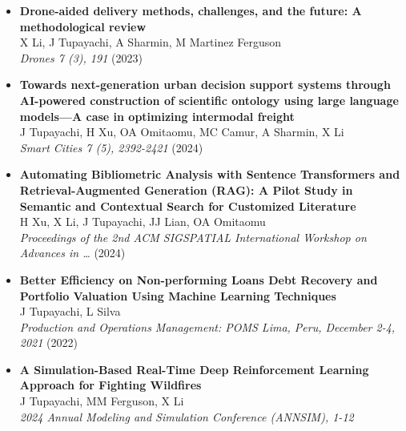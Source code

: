 \documentclass[10pt, letterpaper]{article}
\begin{document}
    \begin{itemize}[left=0pt] %
        \item \textbf{Drone-aided delivery methods, challenges, and the future: A methodological review} \\
        X Li, J Tupayachi, A Sharmin, M Martinez Ferguson \\
        \textit{Drones 7 (3), 191} (2023)\\
    
        \item \textbf{Towards next-generation urban decision support systems through AI-powered construction of scientific ontology using large language models—A case in optimizing intermodal freight} \\
        J Tupayachi, H Xu, OA Omitaomu, MC Camur, A Sharmin, X Li \\
        \textit{Smart Cities 7 (5), 2392-2421} (2024) \\
    
        \item \textbf{Automating Bibliometric Analysis with Sentence Transformers and Retrieval-Augmented Generation (RAG): A Pilot Study in Semantic and Contextual Search for Customized Literature} \\
        H Xu, X Li, J Tupayachi, JJ Lian, OA Omitaomu \\
        \textit{Proceedings of the 2nd ACM SIGSPATIAL International Workshop on Advances in …} (2024) \\
    
        \item \textbf{Better Efficiency on Non-performing Loans Debt Recovery and Portfolio Valuation Using Machine Learning Techniques} \\
        J Tupayachi, L Silva \\
        \textit{Production and Operations Management: POMS Lima, Peru, December 2-4, 2021} (2022) \\
    
    
        \item \textbf{A Simulation-Based Real-Time Deep Reinforcement Learning Approach for Fighting Wildfires} \\
        J Tupayachi, MM Ferguson, X Li \\
        \textit{2024 Annual Modeling and Simulation Conference (ANNSIM), 1-12} \\
    \end{itemize}
    
\end{document}
